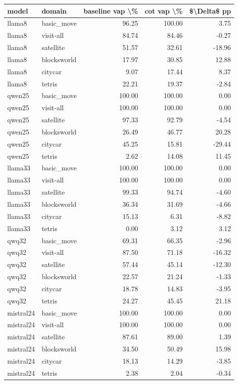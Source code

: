 \begin{tabular}{llrrr}
\toprule
model & domain & baseline vap \textbackslash \% & cot vap \textbackslash \% & \$\textbackslash Delta\$ pp \\
\midrule
llama8 & basic\_move & 96.25 & 100.00 & 3.75 \\
llama8 & visit-all & 84.74 & 84.46 & -0.27 \\
llama8 & satellite & 51.57 & 32.61 & -18.96 \\
llama8 & blocksworld & 17.97 & 30.85 & 12.88 \\
llama8 & citycar & 9.07 & 17.44 & 8.37 \\
llama8 & tetris & 22.21 & 19.37 & -2.84 \\
qwen25 & basic\_move & 100.00 & 100.00 & 0.00 \\
qwen25 & visit-all & 100.00 & 100.00 & 0.00 \\
qwen25 & satellite & 97.33 & 92.79 & -4.54 \\
qwen25 & blocksworld & 26.49 & 46.77 & 20.28 \\
qwen25 & citycar & 45.25 & 15.81 & -29.44 \\
qwen25 & tetris & 2.62 & 14.08 & 11.45 \\
llama33 & basic\_move & 100.00 & 100.00 & 0.00 \\
llama33 & visit-all & 100.00 & 100.00 & 0.00 \\
llama33 & satellite & 99.33 & 94.74 & -4.60 \\
llama33 & blocksworld & 36.34 & 31.69 & -4.66 \\
llama33 & citycar & 15.13 & 6.31 & -8.82 \\
llama33 & tetris & 0.00 & 3.12 & 3.12 \\
qwq32 & basic\_move & 69.31 & 66.35 & -2.96 \\
qwq32 & visit-all & 87.50 & 71.18 & -16.32 \\
qwq32 & satellite & 57.44 & 45.14 & -12.30 \\
qwq32 & blocksworld & 22.57 & 21.24 & -1.33 \\
qwq32 & citycar & 18.78 & 14.83 & -3.95 \\
qwq32 & tetris & 24.27 & 45.45 & 21.18 \\
mistral24 & basic\_move & 100.00 & 100.00 & 0.00 \\
mistral24 & visit-all & 100.00 & 100.00 & 0.00 \\
mistral24 & satellite & 87.61 & 89.00 & 1.39 \\
mistral24 & blocksworld & 34.50 & 50.49 & 15.98 \\
mistral24 & citycar & 18.13 & 14.29 & -3.85 \\
mistral24 & tetris & 2.38 & 2.04 & -0.34 \\
\bottomrule
\end{tabular}
